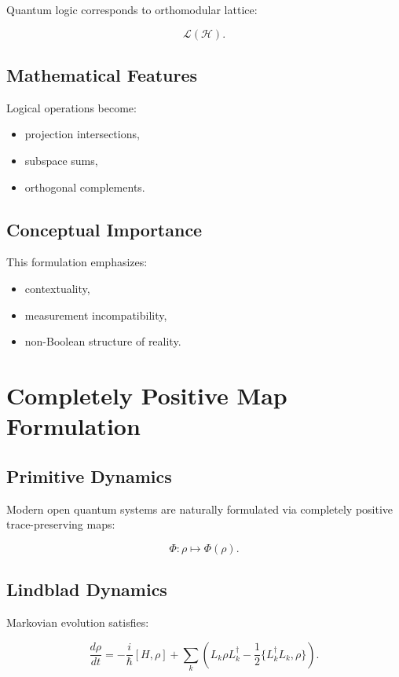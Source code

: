\documentclass[11pt]{article}
\begin{document}
Quantum logic corresponds to orthomodular lattice:

\[
\mathcal L(\mathcal H).
\]

\subsection{Mathematical Features}

Logical operations become:

\begin{itemize}
\item projection intersections,
\item subspace sums,
\item orthogonal complements.
\end{itemize}

\subsection{Conceptual Importance}

This formulation emphasizes:

\begin{itemize}
\item contextuality,
\item measurement incompatibility,
\item non-Boolean structure of reality.
\end{itemize}

\section{Completely Positive Map Formulation}

\subsection{Primitive Dynamics}

Modern open quantum systems are naturally formulated via completely positive trace-preserving maps:

\[
\Phi:
\rho
\mapsto
\Phi(\rho).
\]

\subsection{Lindblad Dynamics}

Markovian evolution satisfies:

\[
\frac{d\rho}{dt}
=
-\frac{i}{\hbar}[H,\rho]
+
\sum_k
\left(
L_k \rho L_k^\dagger
-
\frac12
\{L_k^\dagger L_k,\rho\}
\right).
\]
\end{document}
